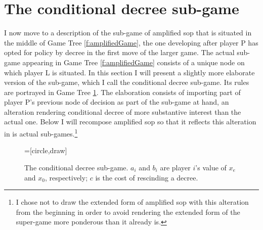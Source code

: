 \section{The conditional decree sub-game}

	I now move to a description of the sub-game of amplified sop that is situated in the middle of Game Tree \ref{f:amplifiedGame}, the one developing after player P has opted for policy by decree in the first move of the larger game.  The actual sub-game appearing in Game Tree \ref{f:amplifiedGame} consists of a unique node on which player L is situated.  In this section I will present a slightly more elaborate version of the sub-game, which I call the conditional decree sub-game.  Its rules are portrayed in Game Tree \ref{f:condDecreeGame}.  The elaboration consists of importing part of player P's previous node of decision as part of the sub-game at hand, an alteration rendering conditional decree of more substantive interest than the actual one.  Below I will recompose amplified sop so that it reflects this alteration in is actual sub-games.\footnote{I chose not to draw the extended form of amplified sop with this alteration from the beginning in order to avoid rendering the extended form of the super-game more ponderous than it already is.}

\begin{figure}
  \begin{center}
    =[circle,draw]
    \caption{The conditional decree sub-game. $a_i$ and $b_i$ are player $i$'s value of $x_e$ and $x_0$, respectively; $c$ is the cost of rescinding a decree.}\label{f:condDecreeGame}
  \end{center}
\end{figure}

